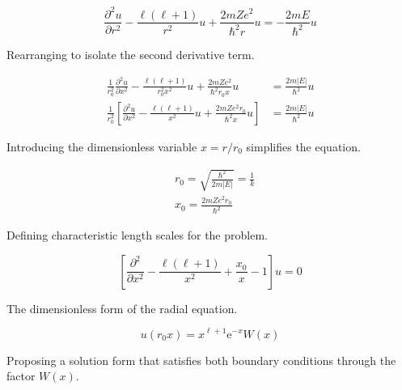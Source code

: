 \documentclass[italian]{HKNdocument}
\begin{document}
\begin{equation}
\frac{\partial^{2} u}{\partial r^{2}}-\frac{\ell(\ell+1)}{r^{2}} u+\frac{2 m Z e^{2}}{\hbar^{2} r} u=-\frac{2 m E}{\hbar^{2}} u
\end{equation}

Rearranging to isolate the second derivative term.

\begin{align}
\frac{1}{r_{0}^{2}} \frac{\partial^{2} u}{\partial x^{2}}-\frac{\ell(\ell+1)}{r_{0}^{2} x^{2}} u+\frac{2 m Z e^{2}}{\hbar^{2} r_{0} x} u & =\frac{2 m|E|}{\hbar^{2}} u \\
\frac{1}{r_{0}^{2}}\left[\frac{\partial^{2} u}{\partial x^{2}}-\frac{\ell(\ell+1)}{x^{2}} u+\frac{2 m Z e^{2} r_{0}}{\hbar^{2} x} u\right] & =\frac{2 m|E|}{\hbar^{2}} u
\end{align}

Introducing the dimensionless variable $x = r/r_0$ simplifies the equation.

\begin{align}
& r_{0}=\sqrt{\frac{\hbar^{2}}{2 m|E|}}=\frac{1}{k}  \\
& x_{0}=\frac{2 m Z e^{2} r_{0}}{\hbar^{2}}
\end{align}

Defining characteristic length scales for the problem.

\begin{equation}
\left[\frac{\partial^{2}}{\partial x^{2}}-\frac{\ell(\ell+1)}{x^{2}}+\frac{x_{0}}{x}-1\right] u=0 \label{eq:9.52}
\end{equation}

The dimensionless form of the radial equation.

\begin{equation}
u\left(r_{0} x\right)=x^{\ell+1} \mathrm{e}^{-x} W(x)
\end{equation}

Proposing a solution form that satisfies both boundary conditions through the factor $W(x)$.
\end{document}
